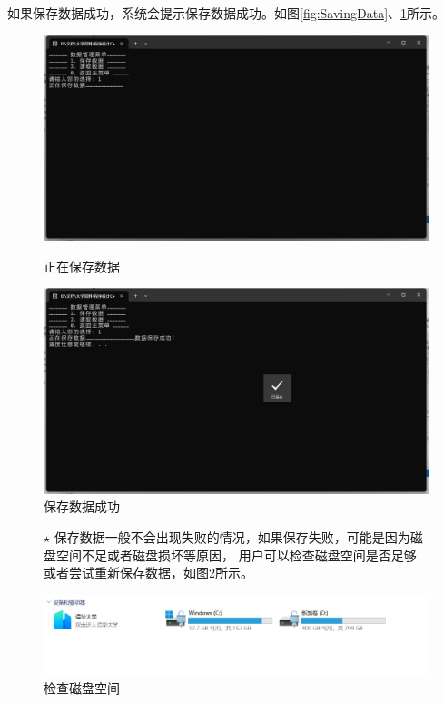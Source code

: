 \documentclass[12pt,twoside]{ctexart}
\begin{document}
如果保存数据成功，系统会提示保存数据成功。如图\ref{fig:SavingData}、\ref{fig:SaveSuccessfully}所示。
\begin{figure}[H]
    \centering
    \begin{minipage}{0.48\textwidth}
        \centering
        \includegraphics[width=\linewidth]{SavingData.png}
        \caption{正在保存数据}
        \label{fig:SavingData}
    \end{minipage}\hfill
    \begin{minipage}{0.48\textwidth}
        \centering
        \includegraphics[width=\linewidth]{SaveDataSuccfully.png}
        \caption{保存数据成功}
        \label{fig:SaveSuccessfully}
    \end{minipage}
\end{figure}

\begin{figure}[H]
    \begin{minipage}[c]{0.5\textwidth}
        $\star$ 保存数据一般不会出现失败的情况，如果保存失败，可能是因为磁盘空间不足或者磁盘损坏等原因，
        用户可以检查磁盘空间是否足够或者尝试重新保存数据，如图\ref{fig:CheckAvailable}所示。
    \end{minipage}%
    \hfill
    \begin{minipage}[c]{0.45\textwidth}
        \centering
        \includegraphics[width=\textwidth]{CheckAvailable.png}
        \caption{检查磁盘空间}
        \label{fig:CheckAvailable}
    \end{minipage}
\end{figure}
\end{document}
